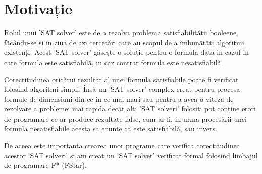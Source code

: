 \chapter*{Motivație} 

Rolul unui 'SAT solver' este de a rezolva problema satisfiabilității booleene, \linebreak făcându-se si in ziua de azi cercetări care au scopul de a îmbunătăți algoritmi existenți. Acest 'SAT solver' găsește o soluție pentru o formula data in cazul in care formula este satisfiabilă, in caz contrar formula este nesatisfiabilă. 

Corectitudinea oricărui rezultat al unei formula satisfiabile poate fi verificat
\linebreak folosind algoritmi simpli. Însă un 'SAT solver' complex creat pentru procesa \linebreak formule de dimensiuni din ce in ce mai mari sau pentru a avea o viteza de rezolvare a \linebreak problemei mai rapida decât alți 'SAT solveri' folosiți pot conține erori de programare ce ar produce rezultate false, cum ar fi, in urma procesării unei formula nesatisfiabile acesta sa enunțe ca este satisfiabilă, sau invers.

De aceea este importanta crearea unor programe care verifica corectitudinea \linebreak acestor 'SAT solveri' si am creat un 'SAT solver' verificat formal folosind limbajul de programare F* (FStar).